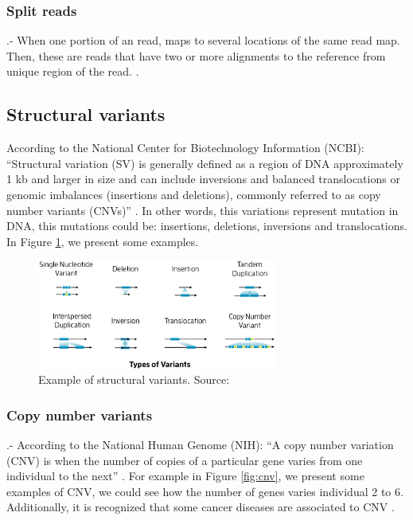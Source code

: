 \documentclass{svproc}
\begin{document}
\subsubsection{Split reads}
.- When one portion of an read, maps to several locations of the same read map. Then, these are reads that have two or more alignments to the reference from unique region of the read. \cite{alig_2021}.

\subsection{Structural variants}
According to the National Center for Biotechnology Information (NCBI): ``Structural variation (SV) is generally defined as a region of DNA approximately 1 kb and larger in size and can include inversions and balanced translocations or genomic imbalances (insertions and deletions), commonly referred to as copy number variants (CNVs)'' \cite{sv_ncbi_2021}. In other words, this variations represent mutation in DNA, this mutations could be: insertions, deletions, inversions and translocations. In Figure \ref{fig:variants}, we present some examples.


\begin{figure}[h]
	\centering
	\includegraphics[width=0.7\textwidth]{img/splitthreader/variants}
	\caption{Example of structural variants. Source: \cite{sv_pacbio_2021}}
	\label{fig:variants}
\end{figure}

\subsubsection{Copy number variants}

.- According to the National Human Genome (NIH): ``A copy number variation (CNV) is when the number of copies of a particular gene varies from one individual to the next'' \cite{cnv_nih_2021}. For example in Figure \ref{fig:cnv}, we present some examples of CNV, we could see how the number of genes varies individual 2 to 6. Additionally, it is recognized that some cancer diseases are associated to CNV \cite{cnv_nih_2021, nattestad2016splitthreader, shlien2009copy, mitelman2007impact}.
\end{document}
